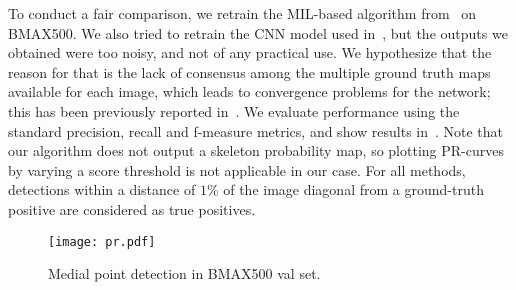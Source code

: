 \documentclass[10pt,twocolumn,letterpaper]{article}
\begin{document}
To conduct a fair comparison, we retrain the MIL-based algorithm from~\cite{tsogkas2012learning} on BMAX500.
We also tried to retrain the CNN model used in~\cite{shen2016object}, but the outputs we obtained were too noisy, 
and not of any practical use.
We hypothesize that the reason for that is the lack of consensus among the multiple ground truth maps
available for each image, which leads to convergence problems for the network; this has been previously
reported in~\cite{xie2015holistically}.
We evaluate performance using the standard precision, recall and f-measure metrics, 
and show results in~.
Note that our algorithm does not output a skeleton probability map, so plotting 
PR-curves by varying a score threshold is not applicable in our case.
For all methods, detections within a distance of $1\%$ of the image diagonal from a ground-truth positive 
are considered as true positives.


\begin{figure}
\centering
\texttt{[image: pr.pdf]}
\caption{Medial point detection in BMAX500 val set.}
\label{fig:experiments:detection:pr}
\end{figure}
\end{document}
